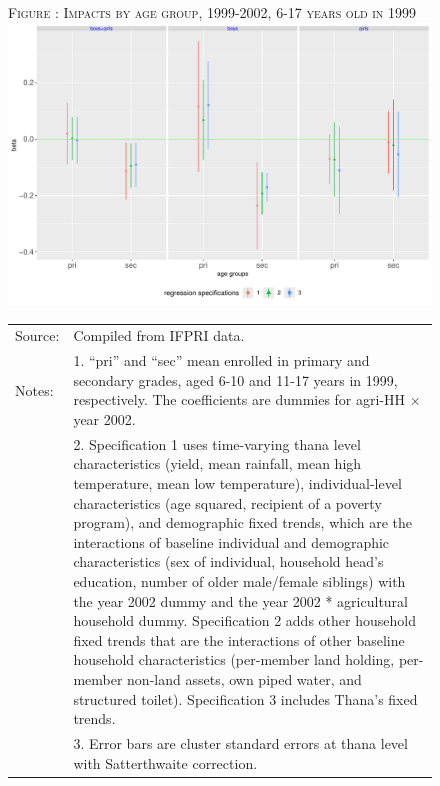 \documentclass[12pt,letterpaper]{article}
\newcommand{\0}{\ensuremath{\mbox{\boldmath $0$}}}
\begin{document}
\begin{figure}
\hfil\textsc{\footnotesize Figure \thefigure: Impacts by age group, 1999-2002, 6-17 years old in 1999\label{GenderAgeGroup2Impacts}}\\
\hfil \includegraphics[height=.23\paperheight]{Figures/GenderAgeGroup2Impacts.pdf}\\
\renewcommand{\arraystretch}{1}
\hfil\begin{tabular}{>{\hfill\scriptsize}p{1cm}<{}>{\scriptsize}p{11cm}<{\hfill}}
Source: & Compiled from IFPRI data. \\[-1ex]
Notes:& 1. ``pri'' and ``sec'' mean enrolled in primary and secondary grades, aged 6-10 and 11-17 years in 1999, respectively. The coefficients are dummies for agri-HH $\times$ year 2002.\\[-1ex]
& 2. Specification 1 uses time-varying thana level characteristics (yield, mean rainfall, mean high temperature, mean low temperature), individual-level characteristics (age squared, recipient of a poverty program), and \textsf{demographic fixed trends,} which are the interactions of baseline individual and demographic characteristics (sex of individual, household head's education, number of older male/female siblings) with the year 2002 dummy and the year 2002 * agricultural household dummy. Specification 2 adds \textsf{other household fixed trends} that are the interactions of other baseline household characteristics (per-member land holding, per-member non-land assets, own piped water, and structured toilet). Specification 3 includes \textsf{Thana's fixed trends}. \\[-1ex]
& 3. Error bars are cluster standard errors at thana level with Satterthwaite correction.
\end{tabular}
\end{figure}
\end{document}
